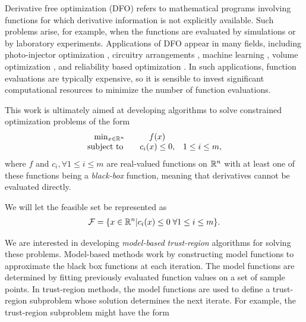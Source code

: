 

Derivative free optimization (DFO) refers to mathematical programs involving functions for which derivative information is not explicitly available.
Such problems arise, for example, when the functions are evaluated by simulations or by laboratory experiments.  Applications of DFO appear in many fields, including photo-injector optimization \cite{1742-6596-874-1-012062}, circuitry arrangements \cite{PLOSKAS201816}, machine learning \cite{KS2018}, volume optimization \cite{Cheng2017}, and reliability based optimization \cite{Gao2017}.
In such applications, function evaluations are typically expensive, so it is sensible to invest significant computational resources to minimize the number of function evaluations.

This work is ultimately aimed at developing algorithms to solve constrained optimization problems of the form 
\begin{align}
\begin{array}{ccl} \min_{x \in \mathbb R^n} & f(x) \\
\mbox{subject to} \quad & c_i(x) \le 0, & 1 \le i \le m,
\end{array}
\label{the_dfo_problem}
\end{align}
where 
$f$ and $c_i, \forall 1 \le i \le m$ are real-valued functions on $\mathbb R^n$ with at least one of these functions being a {\em black-box} function, meaning that derivatives cannot be evaluated directly.

We will let the feasible set be represented as 
\begin{align}
{\mathcal F} = \{x \in \mathbb R^n | c_i(x) \le 0 \; \forall 1 \le i \le m \}. \label{define_feasible}
\end{align}

We are interested in developing {\em model-based} {\em trust-region} algorithms for solving these problems.
Model-based methods work by constructing model functions to approximate the black box functions at each iteration.
The model functions are determined by fitting previously evaluated function values on a set of sample points.
In trust-region methods, the model functions are used to define a trust-region subproblem whose solution determines the next iterate.
For example, the trust-region subproblem might have the form

